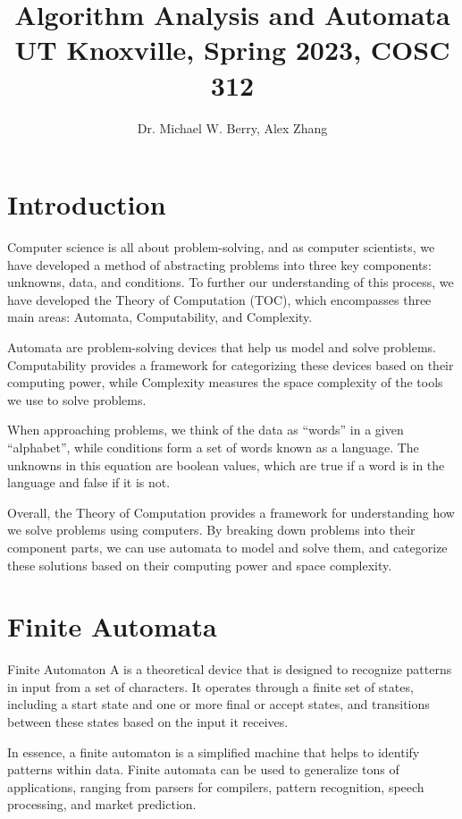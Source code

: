 \documentclass[12pt]{report}
\title{\textbf{Algorithm Analysis and Automata}\\
\large UT Knoxville, Spring 2023, COSC 312}
\author{Dr. Michael W. Berry, Alex Zhang}
\begin{document}
\maketitle
\tableofcontents

\chapter{Introduction}
Computer science is all about problem-solving, and as computer scientists, we have developed a method of abstracting problems into three key components: unknowns, data, and conditions. To further our understanding of this process, we have developed the Theory of Computation (TOC), which encompasses three main areas: Automata, Computability, and Complexity.

Automata are problem-solving devices that help us model and solve problems. Computability provides a framework for categorizing these devices based on their computing power, while Complexity measures the space complexity of the tools we use to solve problems.

When approaching problems, we think of the data as ``words'' in a given ``alphabet'', while conditions form a set of words known as a language. The unknowns in this equation are boolean values, which are true if a word is in the language and false if it is not.

Overall, the Theory of Computation provides a framework for understanding how we solve problems using computers. By breaking down problems into their component parts, we can use automata to model and solve them, and categorize these solutions based on their computing power and space complexity.
\chapter{Finite Automata}

\begin{dfnbox}{Finite Automaton}{}
    A  is a theoretical device that is designed to recognize patterns in input from a set of characters. It operates through a finite set of states, including a start state and one or more final or accept states, and transitions between these states based on the input it receives.
\end{dfnbox}

In essence, a finite automaton is a simplified machine that helps to identify patterns within data. Finite automata can be used to generalize tons of applications, ranging from parsers for compilers, pattern recognition, speech processing, and market prediction.
\end{document}
